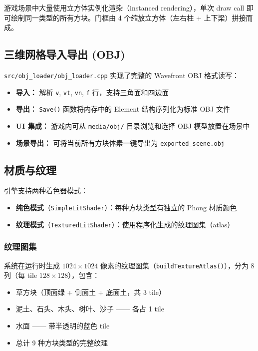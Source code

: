 \documentclass{article}
\begin{document}
游戏场景中大量使用立方体实例化渲染（instanced rendering），单次 draw call 即可绘制同一类型的所有方块。门框由 4 个缩放立方体（左右柱 + 上下梁）拼接而成。

\subsection{三维网格导入导出 (OBJ)}

\texttt{src/obj\_loader/obj\_loader.cpp} 实现了完整的 Wavefront OBJ 格式读写：

\begin{itemize}[nosep]
    \item \textbf{导入：} 解析 \texttt{v}, \texttt{vt}, \texttt{vn}, \texttt{f} 行，支持三角面和四边面
    \item \textbf{导出：} \texttt{Save()} 函数将内存中的 Element 结构序列化为标准 OBJ 文件
    \item \textbf{UI 集成：} 游戏内可从 \texttt{media/obj/} 目录浏览和选择 OBJ 模型放置在场景中
    \item \textbf{场景导出：} 可将当前所有方块体素一键导出为 \texttt{exported\_scene.obj}
\end{itemize}

\subsection{材质与纹理}

引擎支持两种着色器模式：

\begin{itemize}[nosep]
    \item \textbf{纯色模式}（\texttt{SimpleLitShader}）：每种方块类型有独立的 Phong 材质颜色
    \item \textbf{纹理模式}（\texttt{TexturedLitShader}）：使用程序化生成的纹理图集（atlas）
\end{itemize}

\subsubsection{纹理图集}
系统在运行时生成 $1024 \times 1024$ 像素的纹理图集（\texttt{buildTextureAtlas()}），分为 8 列（每 tile $128 \times 128$），包含：
\begin{itemize}[nosep]
    \item 草方块（顶面绿 + 侧面土 + 底面土，共 3 tile）
    \item 泥土、石头、木头、树叶、沙子 —— 各占 1 tile
    \item 水面 —— 带半透明的蓝色 tile
    \item 总计 9 种方块类型的完整纹理
\end{itemize}
\end{document}
